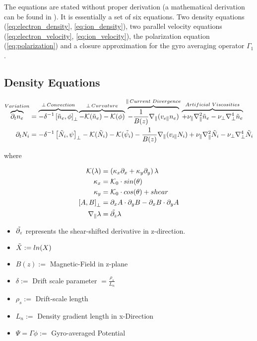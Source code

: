 \documentclass[master.tex]{subfiles}
\begin{document}
The equations are stated without proper derivation (a mathematical derivation can be found in \cite{HeldDisseration}). It is essentially a set of six equations. Two density equations (\autoref{eq:electron_density}, \autoref{eq:ion_density}), two parallel velocity equations (\autoref{eq:electron_velocity}, \autoref{eq:ion_velocity}), the polarization equation (\autoref{eq:polarization}) and a closure approximation for the gyro averaging operator $\Gamma_1$.

\subsection{Density Equations}

\begin{align}
    \overbrace{\partial_t n_e}^{Variation} &=
    \overbrace{-\delta^{-1} \left[\Tilde{n}_e, \phi \right]_{\perp}}^{\perp \, Convection}
    \overbrace{
    - \mathcal{K}(\Tilde{n}_e)
    - \mathcal{K}(\phi)
    }^{\perp \, Curvature}
    \overbrace{
    - \frac{1}{B(z)}\nabla_\parallel (v_{e\parallel} n_e)
    }^{\parallel \, Current\,\, Divergence}
    \overbrace{
    + \nu_\parallel \nabla_\parallel^2\Tilde{n}_e
    - \nu_\perp \nabla^4_\perp\Tilde{n}_e
    }^{Artificial\,\, Viscosities}
    \label{eq:electron_density}
    \\
    \partial_t N_i &=
    -\delta^{-1} \left[\Tilde{N}_i, \psi \right]_{\perp}
    - \mathcal{K}(\Tilde{N}_i)
    - \mathcal{K}(\Tilde{\psi_i})
    - \frac{1}{B(z)}\nabla_\parallel (v_{i\parallel} N_i)
    + \nu_\parallel \nabla_\parallel^2\Tilde{N}_i
    - \nu_\perp \nabla^4_\perp\Tilde{N}_i \label{eq:ion_density}
\end{align}

where

\begin{align}
    \mathcal{K}(\lambda) &= (\kappa_x \partial_x + \kappa_y \partial_y)\,\lambda\\
    \kappa_x &= \mathcal{K}_0 \cdot sin(\theta)\\
    \kappa_y &= \mathcal{K}_0 \cdot cos(\theta) + shear\\
    \left[A, B\right]_\perp &= \partial_x A \cdot \partial_y B - \partial_x B \cdot \partial_y A\\
    \nabla_\parallel \lambda &= \Tilde{\partial_{z}} \lambda
\end{align}
\begin{itemize}
    \item $\Tilde{\partial_{z}}$ represents the shear-shifted derivative in z-direction.
    \item $\Tilde{X} := ln(X)$
    \item $B(z) := $ Magnetic-Field in z-plane
    \item $\delta := $ Drift scale parameter $ = \frac{\rho_s}{L_n}$ 
    \item $\rho_s := $ Drift-scale length
    \item $L_n :=$ Density gradient length in x-Direction
    \item $\Psi = \Gamma \phi := $ Gyro-averaged Potential
\end{itemize}
\end{document}
